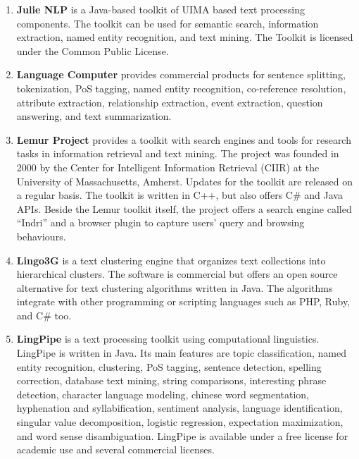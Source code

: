 \begin{enumerate}
	\item \textbf{Julie NLP} \cite{tomanek2007uima,hahn2008overview} is a Java-based toolkit of UIMA based text processing components. The toolkit can be used for semantic search, information extraction, named entity recognition, and text mining.
The Toolkit is licensed under the Common Public License.

	\item \textbf{Language Computer} \cite{lanuagecomputer} provides commercial products for sentence splitting, tokenization, PoS tagging, named entity recognition, co-reference resolution, attribute extraction, relationship extraction, event extraction, question answering, and text summarization.

	\item \textbf{Lemur Project} \cite{lemur} provides a toolkit with search engines and tools for research tasks in information retrieval and text mining. The project was founded in 2000 by the Center for Intelligent Information Retrieval (CIIR) at the University of Massachusetts, Amherst. Updates for the toolkit are released on a regular basis. The toolkit is written in C++, but also offers C\# and Java APIs. Beside the Lemur toolkit itself, the project offers a search engine called ``Indri'' and a browser plugin to capture users' query and browsing behaviours.

	\item \textbf{Lingo3G} \cite{lingo3g} is a text clustering engine that organizes text collections into hierarchical clusters.
The software is commercial but \cite{stefanowski2003carrot} offers an open source alternative for text clustering algorithms written in Java. The algorithms integrate with other programming or scripting languages such as PHP, Ruby, and C\# too.

	\item \textbf{LingPipe} \cite{lingpipe} is a text processing toolkit using computational linguistics. LingPipe is written in Java. Its main features are topic classification, named entity recognition, clustering, PoS tagging, sentence detection, spelling correction, database text mining, string comparisons, interesting phrase detection, character language modeling, chinese word segmentation, hyphenation and syllabification, sentiment analysis, language identification, singular value decomposition, logistic regression, expectation maximization, and word sense disambiguation.
LingPipe is available under a free license for academic use and several commercial licenses.


\end{enumerate}
